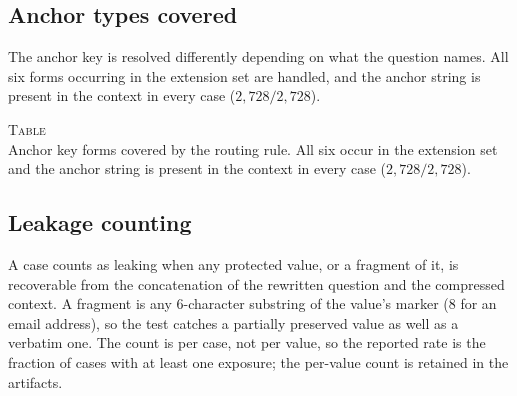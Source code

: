 \subsection{Anchor types covered}

The anchor key is resolved differently depending on what the question names. All six forms
occurring in the extension set are handled, and the anchor string is present in the context
in every case ($2{,}728/2{,}728$).

\begin{center}
{%
\label{tab:app_anchor}%
\footnotesize\textsc{Table \thetable}\\[1pt]
Anchor key forms covered by the routing rule. All six occur in the extension set and the anchor string is present in the context in every case ($2{,}728/2{,}728$).\par}
\vspace{3pt}
{\small\setlength{\tabcolsep}{3pt}%
}
\end{center}
\vspace{2pt}

\subsection{Leakage counting}

A case counts as leaking when any protected value, or a fragment of it, is recoverable from
the concatenation of the rewritten question and the compressed context. A fragment is any
$6$-character substring of the value's marker ($8$ for an email address), so the test catches a
partially preserved value as well as a verbatim one. The count is per case, not per value, so the reported
rate is the fraction of cases with at least one exposure; the per-value count is retained in
the artifacts.

